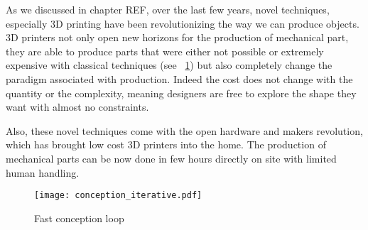 As we discussed in chapter REF, over the last few years, novel techniques, especially 3D printing have been revolutionizing the way we can produce objects. 3D printers not only open new horizons for the production of mechanical part, they are able to produce parts that were either not possible or extremely expensive with classical techniques (see \figurename~\ref{fig:complex_3D_printed_part}) but also completely change the paradigm associated with production. Indeed the cost does not change with the quantity or the complexity, meaning designers are free to explore the shape they want with almost no constraints.

\begin{figure}[tb]
\centering
    \hfil
    \caption{}
    \label{fig:complex_3D_printed_part}
\end{figure}


Also, these novel techniques come with the open hardware and makers revolution, which has brought low cost 3D printers into the home. The production of mechanical parts can be now done in few hours directly on site with limited human handling.

\begin{figure}[tb]
    \begin{center}
        \texttt{[image: conception\_iterative.pdf]}
    \end{center}
    \caption{Fast conception loop}
    \label{fig:conception_loop}
\end{figure}

